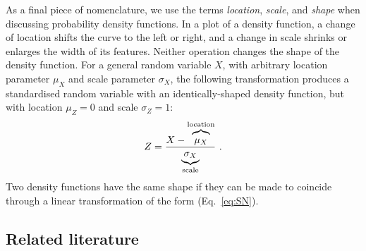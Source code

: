 \documentclass[12pt,letter,timesnewroman]{article}
\newcommand{\elabel}[1]{\label{eq:#1}}
\newcommand{\eref}[1]{(Eq.~\ref{eq:#1})}
\newcommand{\be}{\begin{equation}}
\newcommand{\ee}{\end{equation}}
\begin{document}
As a final piece of nomenclature, we use the terms \textit{location}, \textit{scale}, and \textit{shape} when discussing probability density functions. In a plot of a density function, a change of location shifts the curve to the left or right, and a change in scale shrinks or enlarges the width of its features. Neither operation changes the shape of the density function. For a general random variable $X$, with arbitrary location parameter $\mu_X$ and scale parameter $\sigma_X$, the following transformation produces a standardised random variable with an identically-shaped density function, but with location $\mu_Z=0$ and scale $\sigma_Z=1$:
%
\be
Z = \frac{X-\overbrace{\mu_X \mathstrut}^{\text{location}}}{\underbrace{\sigma_X\mathstrut}_{\text{scale}}}~.
\elabel{SN}
\ee
%
Two density functions have the same shape if they can be made to coincide through a linear transformation of the form \eref{SN}.


\subsection{Related literature}
\end{document}
